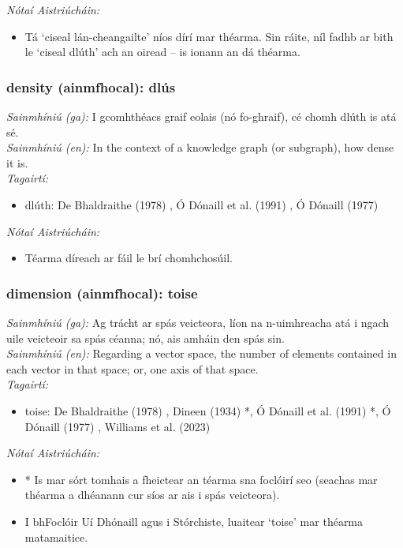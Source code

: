  \noindent \textit{Nótaí Aistriúcháin:}
\begin{itemize}
	\item Tá `ciseal lán-cheangailte' níos dírí mar théarma. Sin ráite, níl fadhb ar bith le `ciseal dlúth' ach an oiread -- is ionann an dá théarma.
\end{itemize}


\subsubsection*{density (ainmfhocal): dlús}
 \noindent \textit{Sainmhíniú (ga):} I gcomhthéacs graif eolais (nó fo-ghraif), cé chomh dlúth is atá sé.
\\
 \noindent \textit{Sainmhíniú (en):} In the context of a knowledge graph (or subgraph), how dense it is.
\\
 \noindent \textit{Tagairtí:}
\begin{itemize}
	\item dlúth: De Bhaldraithe (1978) \cite{de-bhaldraithe}, Ó Dónaill et al. (1991) \cite{focloir-beag}, Ó Dónaill (1977) \cite{odonaill}
\end{itemize}

 \noindent \textit{Nótaí Aistriúcháin:}
\begin{itemize}
	\item Téarma díreach ar fáil le brí chomhchosúil.
\end{itemize}


\subsubsection*{dimension (ainmfhocal): toise}
 \noindent \textit{Sainmhíniú (ga):} Ag trácht ar spás veicteora, líon na n-uimhreacha atá i ngach uile veicteoir sa spás céanna; nó, ais amháin den spás sin.
\\
 \noindent \textit{Sainmhíniú (en):} Regarding a vector space, the number of elements contained in each vector in that space; or, one axis of that space.
\\
 \noindent \textit{Tagairtí:}
\begin{itemize}
	\item toise: De Bhaldraithe (1978) \cite{de-bhaldraithe}, Dineen (1934) \cite{dineen}*, Ó Dónaill et al. (1991) \cite{focloir-beag}*, Ó Dónaill (1977) \cite{odonaill}, Williams et al. (2023) \cite{storchiste}
\end{itemize}

 \noindent \textit{Nótaí Aistriúcháin:}
\begin{itemize}
	\item * Is mar sórt tomhais a fheictear an téarma sna foclóirí seo (seachas mar théarma a dhéanann cur síos ar ais i spás veicteora).
	\item I bhFoclóir Uí Dhónaill agus i Stórchiste, luaitear `toise' mar théarma matamaitice.
\end{itemize}


